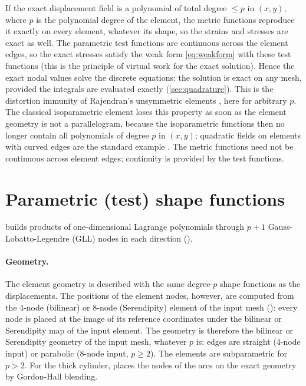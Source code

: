 If the exact displacement field is a polynomial of total degree $\le p$ in
$(x,y)$, where $p$ is the polynomial degree of the element, the metric functions
reproduce it exactly on every element, whatever its shape, so the strains and
stresses are exact as well. The parametric test functions are continuous across
the element edges, so the exact stresses satisfy the weak form \eqref{eq:weakform}
with these test functions (this is the principle of virtual work for the exact
solution). Hence the exact nodal values solve the discrete equations: the solution
is exact on any mesh, provided the integrals are evaluated exactly
(\cref{sec:quadrature}). This is the distortion immunity of Rajendran's
unsymmetric elements \parencite{Rajendran2003novel,Rajendran2010technique}, here
for arbitrary $p$. The classical isoparametric element loses this property as soon
as the element geometry is not a parallelogram, because the isoparametric
functions then no longer contain all polynomials of degree $p$ in $(x,y)$;
quadratic fields on elements with curved edges are the standard example
\parencite{Lee1993effects}. The metric functions need not be continuous across
element edges; continuity is provided by the test functions.

\section{Parametric (test) shape functions}

 builds products of one-dimensional
Lagrange polynomials through $p+1$ Gauss-Lobatto-Legendre (GLL) nodes in each
direction ().

\paragraph{Geometry.} The element geometry is described with the same degree-$p$
shape functions as the displacements. The positions of the element
nodes, however, are computed from the 4-node (bilinear) or 8-node (Serendipity)
element of the input mesh (): every node is
placed at the image of its reference coordinates under the bilinear or
Serendipity map of the input element. The geometry is therefore the bilinear or
Serendipity geometry of the input mesh, whatever $p$ is: edges are straight
(4-node input) or parabolic (8-node input, $p\ge2$). The elements are subparametric
for $p>2$. For the thick cylinder, 
places the nodes of the arcs on the exact geometry by Gordon-Hall blending.

